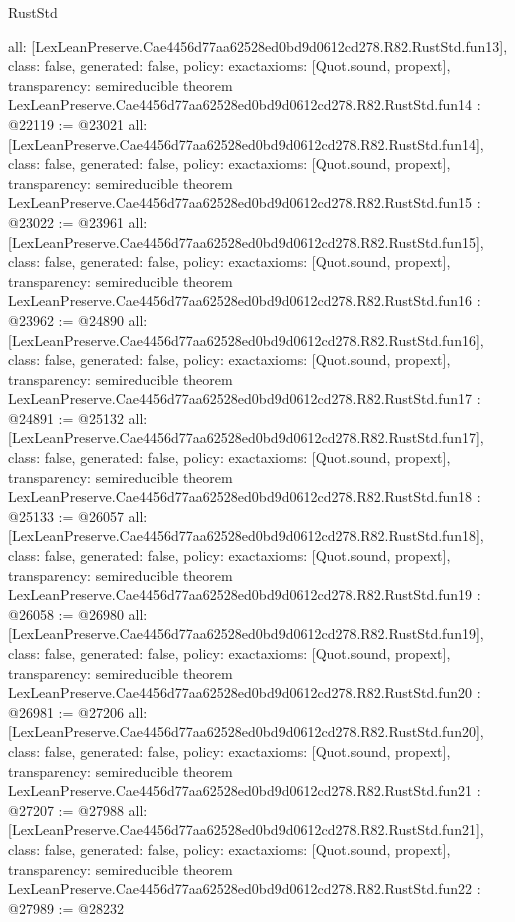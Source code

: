 \begin{lexlean}{RustStd}
\begin{coremodule}
{  all: [LexLeanPreserve.Cae4456d77aa62528ed0bd9d0612cd278.R82.RustStd.fun13],
  class: false,
  generated: false,
  policy: exact{axioms: [Quot.sound, propext]},
  transparency: semireducible
}
theorem LexLeanPreserve.Cae4456d77aa62528ed0bd9d0612cd278.R82.RustStd.fun14 : @22119 := @23021 {
  all: [LexLeanPreserve.Cae4456d77aa62528ed0bd9d0612cd278.R82.RustStd.fun14],
  class: false,
  generated: false,
  policy: exact{axioms: [Quot.sound, propext]},
  transparency: semireducible
}
theorem LexLeanPreserve.Cae4456d77aa62528ed0bd9d0612cd278.R82.RustStd.fun15 : @23022 := @23961 {
  all: [LexLeanPreserve.Cae4456d77aa62528ed0bd9d0612cd278.R82.RustStd.fun15],
  class: false,
  generated: false,
  policy: exact{axioms: [Quot.sound, propext]},
  transparency: semireducible
}
theorem LexLeanPreserve.Cae4456d77aa62528ed0bd9d0612cd278.R82.RustStd.fun16 : @23962 := @24890 {
  all: [LexLeanPreserve.Cae4456d77aa62528ed0bd9d0612cd278.R82.RustStd.fun16],
  class: false,
  generated: false,
  policy: exact{axioms: [Quot.sound, propext]},
  transparency: semireducible
}
theorem LexLeanPreserve.Cae4456d77aa62528ed0bd9d0612cd278.R82.RustStd.fun17 : @24891 := @25132 {
  all: [LexLeanPreserve.Cae4456d77aa62528ed0bd9d0612cd278.R82.RustStd.fun17],
  class: false,
  generated: false,
  policy: exact{axioms: [Quot.sound, propext]},
  transparency: semireducible
}
theorem LexLeanPreserve.Cae4456d77aa62528ed0bd9d0612cd278.R82.RustStd.fun18 : @25133 := @26057 {
  all: [LexLeanPreserve.Cae4456d77aa62528ed0bd9d0612cd278.R82.RustStd.fun18],
  class: false,
  generated: false,
  policy: exact{axioms: [Quot.sound, propext]},
  transparency: semireducible
}
theorem LexLeanPreserve.Cae4456d77aa62528ed0bd9d0612cd278.R82.RustStd.fun19 : @26058 := @26980 {
  all: [LexLeanPreserve.Cae4456d77aa62528ed0bd9d0612cd278.R82.RustStd.fun19],
  class: false,
  generated: false,
  policy: exact{axioms: [Quot.sound, propext]},
  transparency: semireducible
}
theorem LexLeanPreserve.Cae4456d77aa62528ed0bd9d0612cd278.R82.RustStd.fun20 : @26981 := @27206 {
  all: [LexLeanPreserve.Cae4456d77aa62528ed0bd9d0612cd278.R82.RustStd.fun20],
  class: false,
  generated: false,
  policy: exact{axioms: [Quot.sound, propext]},
  transparency: semireducible
}
theorem LexLeanPreserve.Cae4456d77aa62528ed0bd9d0612cd278.R82.RustStd.fun21 : @27207 := @27988 {
  all: [LexLeanPreserve.Cae4456d77aa62528ed0bd9d0612cd278.R82.RustStd.fun21],
  class: false,
  generated: false,
  policy: exact{axioms: [Quot.sound, propext]},
  transparency: semireducible
}
theorem LexLeanPreserve.Cae4456d77aa62528ed0bd9d0612cd278.R82.RustStd.fun22 : @27989 := @28232 {
}
\end{coremodule}
\end{lexlean}
